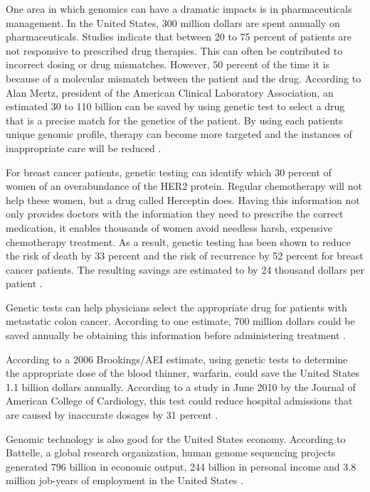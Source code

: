 \documentclass[sigconf]{acmart}
\begin{document}
One area in which genomics can have a dramatic impacts is in pharmaceuticals management. In the United States, 300 million dollars are spent annually on pharmaceuticals. Studies indicate that between 20 to 75 percent of patients are not responsive to prescribed drug therapies.  This can often be contributed to incorrect dosing or drug mismatches. However, 50 percent of the time it is because of a molecular mismatch between the patient and the drug. According to Alan Mertz, president of the American Clinical Laboratory Association, an estimated 30 to 110 billion can be saved by using genetic test to select a drug that is a precise match for the genetics of the patient. By using each patients unique genomic profile, therapy can become more targeted and the instances of inappropriate care will be reduced \cite{www-google-geno}.

For breast cancer patients, genetic testing can identify which 30 percent of women of an overabundance of the HER2 protein. Regular chemotherapy will not help these women, but a drug called Herceptin does. Having this information not only provides doctors with the information they need to prescribe the correct medication, it enables thousands of women avoid needless harsh, expensive chemotherapy treatment.  As a result, genetic testing has been shown to reduce the risk of death by 33 percent and the risk of recurrence by 52 percent for breast cancer patients. The resulting savings are estimated to by 24 thousand dollars per patient \cite{www-google-geno}.

Genetic tests can help physicians select the appropriate drug for patients with metastatic colon cancer. According to one estimate, 700 million dollars could be saved annually be obtaining this information before administering treatment \cite{www-google-geno}.

According to a 2006 Brookings/AEI estimate, using genetic tests to determine the appropriate dose of the blood thinner, warfarin, could save the United States 1.1 billion dollars annually.  According to a study in June 2010 by the Journal of American College of Cardiology, this test could reduce hospital admissions that are caused by inaccurate dosages by 31 percent \cite{www-google-geno}.

Genomic technology is also good for the United States economy. According to Battelle, a global research organization, human genome sequencing projects generated 796 billion in economic output, 244 billion in personal income and 3.8 million job-years of employment in the United States \cite{www-google-geno}. 
\end{document}
